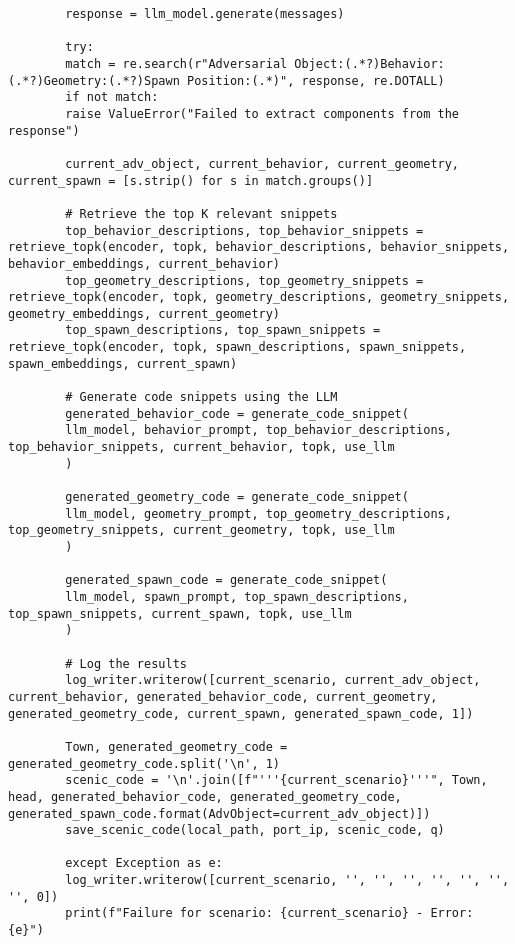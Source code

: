 \begin{lstlisting}
		response = llm_model.generate(messages)
		
		try:
		match = re.search(r"Adversarial Object:(.*?)Behavior:(.*?)Geometry:(.*?)Spawn Position:(.*)", response, re.DOTALL)
		if not match:
		raise ValueError("Failed to extract components from the response")
		
		current_adv_object, current_behavior, current_geometry, current_spawn = [s.strip() for s in match.groups()]
		
		# Retrieve the top K relevant snippets
		top_behavior_descriptions, top_behavior_snippets = retrieve_topk(encoder, topk, behavior_descriptions, behavior_snippets, behavior_embeddings, current_behavior)
		top_geometry_descriptions, top_geometry_snippets = retrieve_topk(encoder, topk, geometry_descriptions, geometry_snippets, geometry_embeddings, current_geometry)
		top_spawn_descriptions, top_spawn_snippets = retrieve_topk(encoder, topk, spawn_descriptions, spawn_snippets, spawn_embeddings, current_spawn)
		
		# Generate code snippets using the LLM
		generated_behavior_code = generate_code_snippet(
		llm_model, behavior_prompt, top_behavior_descriptions, top_behavior_snippets, current_behavior, topk, use_llm
		)
		
		generated_geometry_code = generate_code_snippet(
		llm_model, geometry_prompt, top_geometry_descriptions, top_geometry_snippets, current_geometry, topk, use_llm
		)
		
		generated_spawn_code = generate_code_snippet(
		llm_model, spawn_prompt, top_spawn_descriptions, top_spawn_snippets, current_spawn, topk, use_llm
		)
		
		# Log the results
		log_writer.writerow([current_scenario, current_adv_object, current_behavior, generated_behavior_code, current_geometry, generated_geometry_code, current_spawn, generated_spawn_code, 1])
		
		Town, generated_geometry_code = generated_geometry_code.split('\n', 1)
		scenic_code = '\n'.join([f"'''{current_scenario}'''", Town, head, generated_behavior_code, generated_geometry_code, generated_spawn_code.format(AdvObject=current_adv_object)])
		save_scenic_code(local_path, port_ip, scenic_code, q)
		
		except Exception as e:
		log_writer.writerow([current_scenario, '', '', '', '', '', '', '', 0])
		print(f"Failure for scenario: {current_scenario} - Error: {e}")
		
		
\end{lstlisting}

